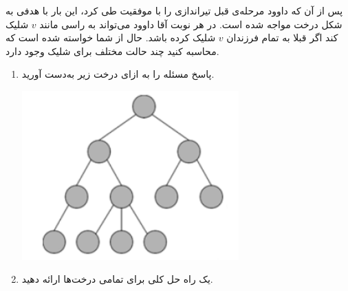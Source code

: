     \p 
پس از آن که داوود مرحله‌ی قبل تیراندازی را با موفقیت طی کرد، این بار با هدفی به شکل درخت مواجه شده است. در هر نوبت آقا داوود می‌تواند به راسی مانند
$v$
شلیک کند اگر قبلا به تمام فرزندان
$v$
شلیک کرده باشد. حال از شما خواسته شده است که محاسبه کنید چند حالت مختلف برای شلیک وجود دارد.
\begin{enumerate}
\item
پاسخ مسئله را به ازای درخت زیر به‌دست آورید.
\begin{center}
\includegraphics[height=6.5cm]{1.png}
\end{center}
\item
یک راه حل کلی برای تمامی درخت‌ها ارائه دهید.
\end{enumerate}
